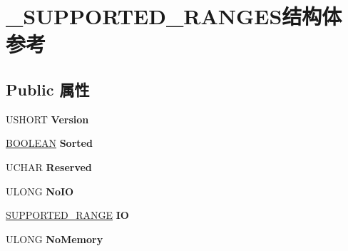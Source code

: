 \hypertarget{struct___s_u_p_p_o_r_t_e_d___r_a_n_g_e_s}{}\section{\+\_\+\+S\+U\+P\+P\+O\+R\+T\+E\+D\+\_\+\+R\+A\+N\+G\+E\+S结构体 参考}
\label{struct___s_u_p_p_o_r_t_e_d___r_a_n_g_e_s}
\subsection*{Public 属性}
\begin{DoxyCompactItemize}
\item 
\mbox{\label{struct___s_u_p_p_o_r_t_e_d___r_a_n_g_e_s_a1462b89aa32530185cfd09ea9a1ac579}} 
U\+S\+H\+O\+RT {\bfseries Version}
\item 
\mbox{\label{struct___s_u_p_p_o_r_t_e_d___r_a_n_g_e_s_a833b039de3196da1cf41bd93375b1ddc}} 
\hyperlink{_processor_bind_8h_a112e3146cb38b6ee95e64d85842e380a}{B\+O\+O\+L\+E\+AN} {\bfseries Sorted}
\item 
\mbox{\label{struct___s_u_p_p_o_r_t_e_d___r_a_n_g_e_s_a4d75487708954556c76dcd2922e6f755}} 
U\+C\+H\+AR {\bfseries Reserved}
\item 
\mbox{\label{struct___s_u_p_p_o_r_t_e_d___r_a_n_g_e_s_a15834c58c90c106e04af79c484c50791}} 
U\+L\+O\+NG {\bfseries No\+IO}
\item 
\mbox{\label{struct___s_u_p_p_o_r_t_e_d___r_a_n_g_e_s_a911bb48391fde7bc655eed4b8764590d}} 
\hyperlink{struct___s_u_p_p_o_r_t_e_d___r_a_n_g_e}{S\+U\+P\+P\+O\+R\+T\+E\+D\+\_\+\+R\+A\+N\+GE} {\bfseries IO}
\item 
\mbox{\label{struct___s_u_p_p_o_r_t_e_d___r_a_n_g_e_s_a630b3b1292f456667f3420de85ebd2d6}} 
U\+L\+O\+NG {\bfseries No\+Memory}
\item 
\mbox{\label{struct___s_u_p_p_o_r_t_e_d___r_a_n_g_e_s_a897cb8faa2a39b25ba4f93d085e38938}} 

\end{DoxyCompactItemize}
